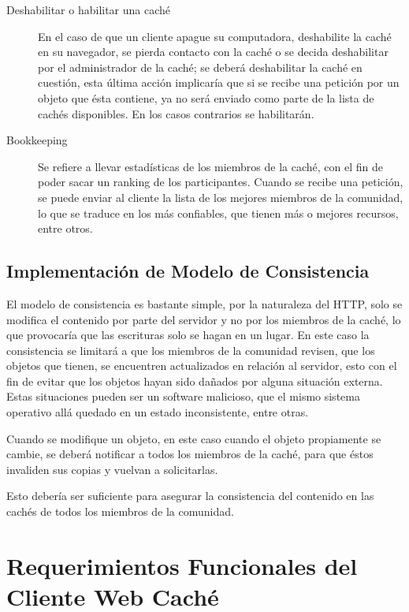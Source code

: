 \begin{description}
\item[Deshabilitar o habilitar una caché] En el caso de que un cliente apague su computadora, deshabilite la caché en su navegador, se pierda contacto con la caché o se decida deshabilitar por el administrador de la caché; se deberá deshabilitar la caché en cuestión, esta última acción implicaría que si se recibe una petición por un objeto que ésta contiene, ya no será enviado como parte de la lista de cachés disponibles. En los casos contrarios se habilitarán.

\item [Bookkeeping] Se refiere a llevar estadísticas de los miembros de la caché, con el fin de poder sacar un ranking de los participantes. Cuando se recibe una petición, se puede enviar al cliente la lista de los mejores miembros de la comunidad, lo que se traduce en los más confiables, que tienen más o mejores recursos, entre otros.

\end{description}


\subsection{Implementación de Modelo de Consistencia}
El modelo de consistencia es bastante simple, por la naturaleza del HTTP, solo se modifica el contenido por parte del servidor y no por los miembros de la caché, lo que provocaría que las escrituras solo se hagan en un lugar. En este caso la consistencia se limitará a que los miembros de la comunidad revisen, que los objetos que tienen, se encuentren actualizados en relación al servidor, esto con el fin de evitar que los objetos hayan sido dañados por alguna situación externa. Estas situaciones pueden ser un software malicioso, que el mismo sistema operativo allá quedado en un estado inconsistente, entre otras.

Cuando se modifique un objeto, en este caso cuando el objeto propiamente se cambie, se deberá notificar a todos los miembros de la caché, para que éstos invaliden sus copias y vuelvan a solicitarlas. 

Esto debería ser suficiente para asegurar la consistencia del contenido en las cachés de todos los miembros de la comunidad. 


\section{Requerimientos Funcionales del Cliente Web Caché}

